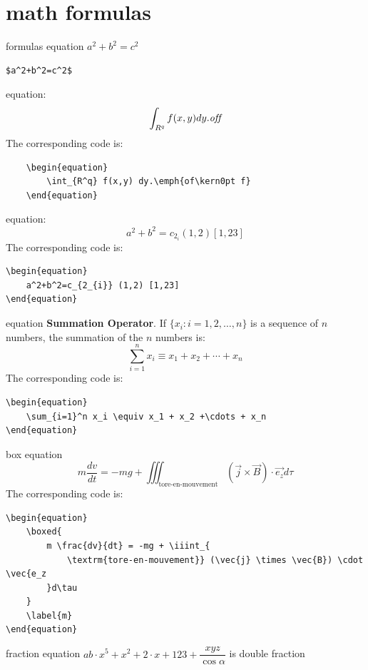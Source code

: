 \documentclass[11pt]{elegantbook}
\begin{document}
\section{math formulas}
formulas
equation
$a^2+b^2=c^2$
\begin{lstlisting}
$a^2+b^2=c^2$
\end{lstlisting}
equation:
\begin{equation}
	\int_{R^q} f(x,y) dy.\emph{of\kern0pt f}
\end{equation}
The corresponding code is: 
\begin{lstlisting}
	\begin{equation}
		\int_{R^q} f(x,y) dy.\emph{of\kern0pt f}
	\end{equation}
\end{lstlisting}
equation:
\begin{equation}
	a^2+b^2=c_{2_{i}} (1,2) [1,23]
\end{equation}
The corresponding code is: 
\begin{lstlisting}
\begin{equation}
	a^2+b^2=c_{2_{i}} (1,2) [1,23]
\end{equation}
\end{lstlisting}
equation
\textbf{Summation Operator}. If $\{x_i: i=1, 2, \ldots, n\}$ is a sequence of $n$ numbers, the summation of the $n$ numbers is:
\begin{equation}
	\sum_{i=1}^n x_i \equiv x_1 + x_2 +\cdots + x_n
\end{equation}
The corresponding code is: 
\begin{lstlisting}
\begin{equation}
	\sum_{i=1}^n x_i \equiv x_1 + x_2 +\cdots + x_n
\end{equation}
\end{lstlisting}
box equation
\begin{equation}
	\boxed{
		m \frac{dv}{dt} = -mg + \iiint_{
			\textrm{tore-en-mouvement}} (\vec{j} \times \vec{B}) \cdot \vec{e_z
		}d\tau
	}
	\label{m}
\end{equation}
The corresponding code is: 
\begin{lstlisting}
\begin{equation}
	\boxed{
		m \frac{dv}{dt} = -mg + \iiint_{
			\textrm{tore-en-mouvement}} (\vec{j} \times \vec{B}) \cdot \vec{e_z
		}d\tau
	}
	\label{m}
\end{equation}
\end{lstlisting}
fraction equation
$ab \cdot x^5 + x^2 + 2 \cdot x + 123 + \dfrac{xyz}{\cos \alpha}$ is double fraction
\end{document}
